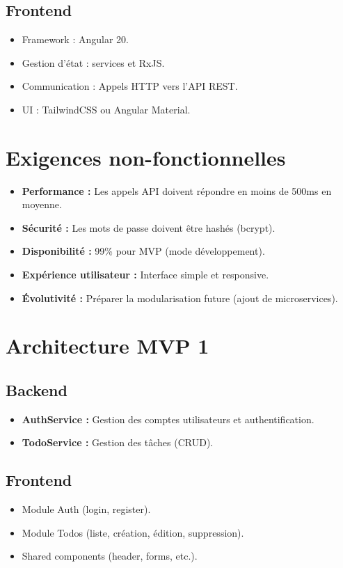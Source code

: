 \subsection{Frontend}
\begin{itemize}
	\item Framework : Angular 20.
	\item Gestion d’état : services et RxJS.
	\item Communication : Appels HTTP vers l’API REST.
	\item UI : TailwindCSS ou Angular Material.
\end{itemize}

\section{Exigences non-fonctionnelles}
\begin{itemize}
	\item \textbf{Performance :} Les appels API doivent répondre en moins de 500ms en moyenne.
	\item \textbf{Sécurité :} Les mots de passe doivent être hashés (bcrypt).
	\item \textbf{Disponibilité :} 99\% pour MVP (mode développement).
	\item \textbf{Expérience utilisateur :} Interface simple et responsive.
	\item \textbf{Évolutivité :} Préparer la modularisation future (ajout de microservices).
\end{itemize}

\section{Architecture MVP 1}
\subsection{Backend}
\begin{itemize}
	\item \textbf{AuthService :} Gestion des comptes utilisateurs et authentification.
	\item \textbf{TodoService :} Gestion des tâches (CRUD).
\end{itemize}

\subsection{Frontend}
\begin{itemize}
	\item Module Auth (login, register).
	\item Module Todos (liste, création, édition, suppression).
	\item Shared components (header, forms, etc.).
\end{itemize}

